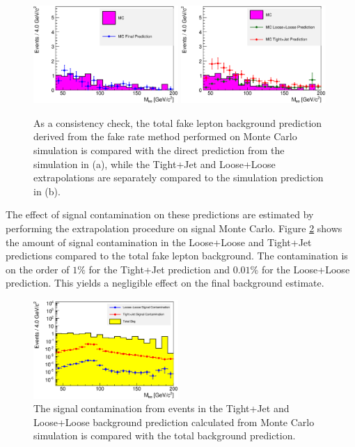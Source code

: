 \documentclass{cmspaper}
\begin{document}
\begin{figure}[htb]
\begin{center}
\includegraphics[width=0.49\textwidth]{MCFakeRatePrediction_FinalVsMC.eps}
\includegraphics[width=0.49\textwidth]{MCFakeRatePrediction_LooseLooseTightJetVsMC.eps}
   \caption{As a consistency check, the total fake lepton background prediction derived from the fake rate method performed on Monte Carlo simulation is compared with the direct prediction from the simulation in (a), while the Tight+Jet and Loose+Loose extrapolations are separately compared to the simulation prediction in (b). }
   \label{fig:ZeeTotalFakeBkgPrediction_MC}
\end{center}
\end{figure}

The effect of signal contamination on these predictions are estimated by performing the extrapolation procedure on signal Monte Carlo. Figure \ref{fig:ZeeSignalContamination} shows the amount of signal contamination in the Loose+Loose and Tight+Jet predictions compared to the total fake lepton background. The contamination is on the order of $1\%$ for the Tight+Jet prediction and $0.01\%$ for the Loose+Loose prediction. This yields a negligible effect on the final background estimate. 

\begin{figure}[htb]
\begin{center}
\includegraphics[width=0.49\textwidth]{SignalFakeRateContamination_LooseLooseTightJetVsMCBkg.eps}
   \caption{The signal contamination from \Z\To\EE events in the Tight+Jet and Loose+Loose background prediction calculated from Monte Carlo simulation is compared with the total background prediction. }
   \label{fig:ZeeSignalContamination}
\end{center}
\end{figure}
\end{document}
